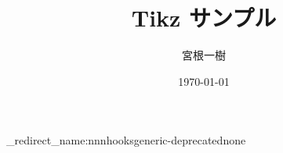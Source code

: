 \usepackage{luatexja-fontspec}
\setmainfont{TeX Gyre Termes}

\usepackage{silence}
\ExplSyntaxOn
\msg_redirect_name:nnn{hooks}{generic-deprecated}{none}
\ExplSyntaxOff

\usepackage{graphics}
\usepackage[dvipsnames,svgnames]{xcolor}

\usepackage{tikz,pgf,pgfplots,circuitikz}
\pgfplotsset{compat=1.15}
\usetikzlibrary{intersections,arrows.meta,angles,calc,3d,decorations.pathmorphing}
\usepackage[compat=1.1.0]{tikz-feynhand}

\usepackage{amssymb,amsfonts,amsthm,mathtools}
\usepackage{physics,braket,bm}

\title{Tikz サンプル}
\author{宮根一樹}
\date{\today}
